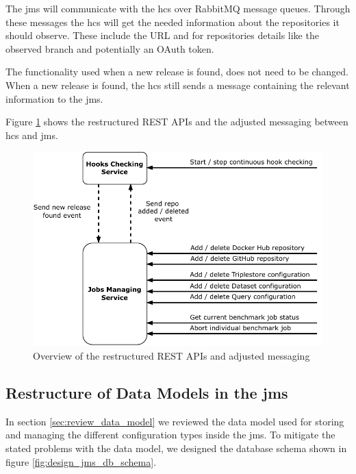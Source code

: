 The \ac{jms} will communicate with the \ac{hcs} over RabbitMQ message queues.
Through these messages the \ac{hcs} will get the needed information about the repositories it should observe.
These include the URL and for \gh{} repositories details like the observed branch and potentially an OAuth token.

The functionality used when a new release is found, does not need to be changed.
When a new release is found, the \ac{hcs} still sends a message containing the relevant information to the \ac{jms}.
\\


Figure \ref{fig:repo_management_restructure} shows the restructured REST APIs and the adjusted messaging between \ac{hcs} and \ac{jms}.

\begin{figure}[tbph]
	\centering
	\includegraphics[width=.65\textwidth]{figures/messaging-implementation-hcs-jms.pdf}
	\caption{Overview of the restructured REST APIs and adjusted messaging}
	\label{fig:repo_management_restructure}
\end{figure}



\subsection{Restructure of Data Models in the \acl{jms}}
\label{sec:data_model_restructure_jms}
In section \ref{sec:review_data_model} we reviewed the data model used for storing and managing the different configuration types inside the \ac{jms}.
To mitigate the stated problems with the data model, we designed the database schema shown in figure \ref{fig:design_jms_db_schema}.

